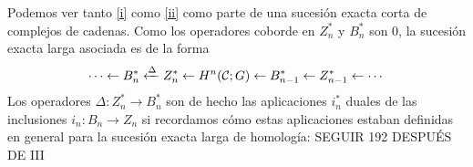 \documentclass[TA.tex]{subfiles}
\begin{document}
Podemos ver tanto \ref{i} como \ref{ii} como parte de una sucesión exacta corta de complejos de cadenas. Como los operadores coborde en $Z_n^*$ y $B_n^*$ son 0, la sucesión exacta larga asociada es de la forma
\begin{equation}
\cdots\leftarrow B_n^*\xleftarrow{\Delta} Z_n^*\leftarrow H^n(\mathcal{C};G)\leftarrow B_{n-1}^*\leftarrow Z_{n-1}^*\leftarrow\cdots
\end{equation}
Los operadores $\Delta:Z_n^*\to B_n^*$ son de hecho las aplicaciones $i_n^*$ duales de las inclusiones $i_n:B_n\to Z_n$ si recordamos cómo estas aplicaciones estaban definidas en general para la sucesión exacta larga de homología: SEGUIR 192 DESPUÉS DE III
\end{document}
